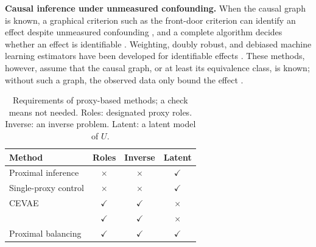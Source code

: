 \textbf{Causal inference under unmeasured confounding.} When the causal graph is known, a graphical criterion such as the front-door criterion can identify an effect despite unmeasured confounding \citep{pearl2009causality,fulcher2020robust,jung2026debiased}, and a complete algorithm decides whether an effect is identifiable \citep{tian2002general,shpitser2006identification}. Weighting, doubly robust, and debiased machine learning estimators have been developed for identifiable effects \citep{jung2020estimating,jung2020werm,jung2021estimating-dml,jung2021estimating-mec,bhattacharya2022semiparametric,jung2023estimating-obs-exp,guo2023targeted,jung2024complete,jung2024uca}. These methods, however, assume that the causal graph, or at least its equivalence class, is known; without such a graph, the observed data only bound the effect \citep{jung2026information}.

\begin{table}
\vspace{-\baselineskip}
\centering
\small
\setlength{\tabcolsep}{2.5pt}
\caption[Requirements of proxy-based methods.]{Requirements of proxy-based methods; a check means not needed. Roles: designated proxy roles. Inverse: an inverse problem. Latent: a latent model of $U$.}
\label{tab:related-work-delta}
\begin{tabular}{@{}lccc@{}}
\toprule
Method & Roles & Inverse & Latent \\
\midrule
Proximal inference & $\times$ & $\times$ & $\checkmark$ \\
Single-proxy control & $\times$ & $\times$ & $\checkmark$ \\
CEVAE & $\checkmark$ & $\checkmark$ & $\times$ \\
\citeauthor{saha2026causal} & $\checkmark$ & $\checkmark$ & $\times$ \\
Proximal balancing & $\checkmark$ & $\checkmark$ & $\checkmark$ \\
\bottomrule
\end{tabular}
\vspace{-\baselineskip}
\end{table}

